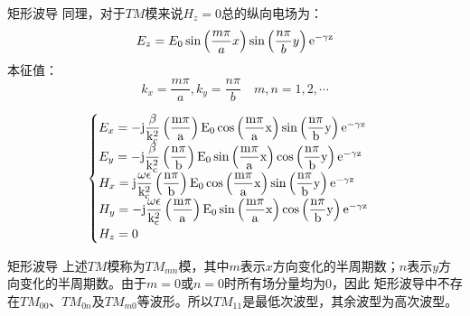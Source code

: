 \begin{frame}{矩形波导}
    同理，对于$TM$模来说$H_z=0$总的纵向电场为：
    \begin{align}
        E_z=E_0\sin\left(\frac{m\pi}{a}x\right)\sin\left(\frac{n\pi}{b}y\right)\rm{e}^{-\gamma z}
    \end{align}
    本征值：
    $$k_x=\frac{m\pi}{a},k_y=\frac{n\pi}{b}\quad m,n=1,2,\cdots$$
    
    \begin{align*}
        \begin{cases}
            E_x = -\rm{j}\dfrac{\beta}{k_c^2}\left(\dfrac{m\pi}{a}\right)E_0\cos\left(\dfrac{m\pi}{a}x\right)\sin\left(\dfrac{n\pi}{b}y\right)\rm{e}^{-\gamma z}\\
            E_y = -\rm{j}\dfrac{\beta}{k_c^2}\left(\dfrac{n\pi}{b}\right)E_0\sin\left(\dfrac{m\pi}{a}x\right)\cos\left(\dfrac{n\pi}{b}y\right)\rm{e}^{-\gamma z}\\
            H_x = \rm{j}\dfrac{\omega\epsilon}{k_c^2}\left(\dfrac{n\pi}{b}\right)E_0\cos\left(\dfrac{m\pi}{a}x\right)\sin\left(\dfrac{n\pi}{b}y\right)\rm{e}^{-\gamma z}\\
            H_y = -\rm{j}\dfrac{\omega\epsilon}{k_c^2}\left(\dfrac{m\pi}{a}\right)E_0\sin\left(\dfrac{m\pi}{a}x\right)\cos\left(\dfrac{n\pi}{b}y\right)\rm{e}^{-\gamma z}\\
            H_z = 0
        \end{cases}
    \end{align*}
\end{frame}

\begin{frame}{矩形波导}
    上述$TM$模称为$TM_{mn}$模，其中$m$表示$x$方向变化的半周期数；$n$表示$y$方向变化的半周期数。由于$m=0$或$n=0$时所有场分量均为0，因此
    矩形波导中不存在$TM_{00}$、$TM_{0n}$及$TM_{m0}$等波形。所以$TM_{11}$是最低次波型，其余波型为高次波型。\\
\end{frame}

